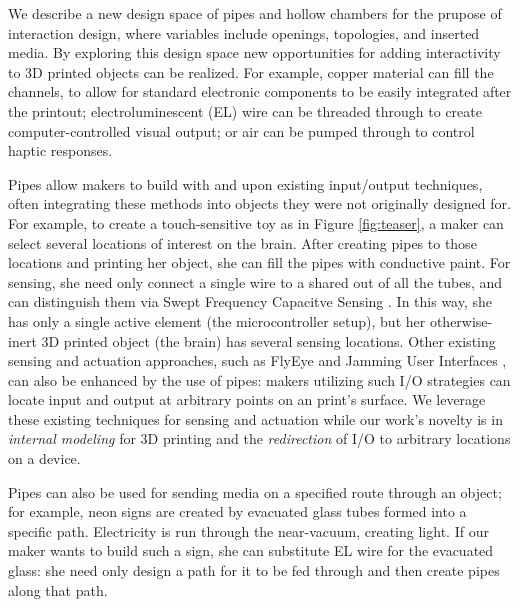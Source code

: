 We describe a new design space of pipes and hollow chambers for the prupose of interaction design, where variables include openings, topologies, and inserted media. By exploring this design space new opportunities for adding interactivity to 3D printed objects can be realized. For example, copper material can fill the channels, to allow for standard electronic components to be easily integrated after the printout; electroluminescent (EL) wire can be threaded through to create computer-controlled visual output; or air can be pumped through to control haptic responses.

Pipes allow makers to build with and upon existing input/output techniques, often integrating these methods into objects they were not originally designed for.   For example, to create a touch-sensitive toy as in Figure \ref{fig:teaser}, a maker can select several locations of interest on the brain.  After creating pipes to those locations and printing her object, she can fill the pipes with conductive paint.  For sensing, she need only connect a single wire to a shared out of all the tubes, and can distinguish them via Swept Frequency Capacitve Sensing \cite{Sato-touche}.  In this way, she has only a single active element (the microcontroller setup), but her otherwise-inert 3D printed object (the brain) has several sensing locations.  Other existing sensing and actuation approaches, such as FlyEye \cite{Wimmer-flyeye} and Jamming User Interfaces \cite{Follmer-jamming}, can also be enhanced by the use of pipes: makers utilizing such I/O strategies can locate input and output at arbitrary points on an print's surface.  We leverage these existing techniques for sensing and actuation while our work's novelty is in \emph{internal modeling} for 3D printing and the \emph{redirection} of I/O to arbitrary locations on a device.

Pipes can also be used for sending media on a specified route through an object; for example, neon signs are created by evacuated glass tubes formed into a specific path.  Electricity is run through the near-vacuum, creating light.  If our maker wants to build such a sign, she can substitute EL wire for the evacuated glass: she need only design a path for it to be fed through and then create pipes along that path.

